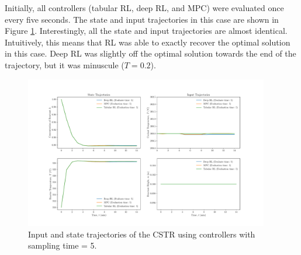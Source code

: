 Initially, all controllers (tabular RL, deep RL, and MPC) were evaluated once every five seconds. The state and input trajectories in this case are shown in Figure \ref{fig:04CSTR_5}.  Interestingly, all the state and input trajectories are almost identical. Intuitively, this means that RL was able to exactly recover the optimal solution in this case. Deep RL was slightly off the optimal solution towards the end of the trajectory, but it was minuscule ($T = 0.2$).
\begin{figure}[H]
    \centering
    \includegraphics[width=0.95\textwidth]{images/ch4/States_and_Inputs_5_CSTR.pdf}
    \caption{Input and state trajectories of the CSTR using controllers with sampling time = 5.}
    \label{fig:04CSTR_5}
\end{figure}

